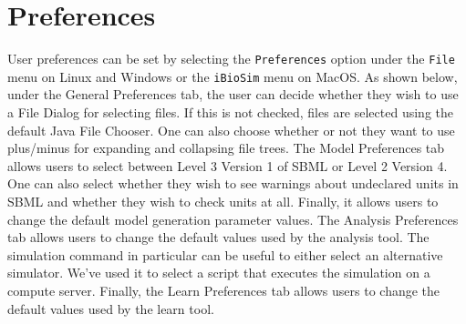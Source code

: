 \documentclass[titlepage,11pt]{article}
\begin{document}
\section{\label{Preferences}Preferences}

\noindent
User preferences can be set by selecting the {\tt Preferences} option under the {\tt File} menu on Linux and Windows or the {\tt iBioSim} menu on MacOS.  As shown below, under the General Preferences tab, the
user can decide whether they wish to use a File Dialog for selecting files.  If this is not checked, files are selected using the default Java File Chooser.  One can also choose whether or not they want to use plus/minus for expanding and collapsing file trees.  The Model Preferences tab allows users to select between Level 3 Version 1 of SBML or Level 2 Version 4.  One can also select whether they wish to see warnings about undeclared units in SBML and whether they wish to check units at all.  Finally, it allows users to change the default model generation parameter values.  The Analysis Preferences tab allows users to change the default values used by the analysis tool.  The simulation command in particular can be useful to either select an alternative simulator.  We've used it to select a script that executes the simulation on a compute server.  Finally, the Learn Preferences tab allows users to change the default values used by the learn tool.
\end{document}
